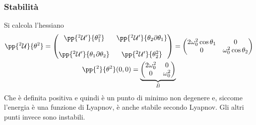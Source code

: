 \documentclass[Main.tex]{subfiles}
\begin{document}
\begin{tema}
\subsubsection*{Stabilità}
Si calcola l'hessiano
\begin{gather}
	\pp{^2 \U}{\theta^2} = \left(\begin{matrix}
		\pp{^2 \U'}{\theta_1^2} & \pp{^2 \U'}{\theta _2 \partial \theta_1} \\  \ \\
		\pp{^2 \U' }{\theta_1 \partial \theta_2} & \pp{^2 \U'}{\theta_2^2}
	\end{matrix}\right) = \left( \begin{matrix}
		2 \omega_0^2 \cos \theta_1 & 0 \\ 0 & \omega_0 ^2 \cos \theta_2
	\end{matrix} \right)\\
	\pp{^2}{\theta^2} (0,0) =  \underbrace{ \left(\begin{matrix}
		2 \omega_0^2 & 0 \\ 0 & \omega_0^2
	\end{matrix} \right)}_{\bar B}
\end{gather}
Che è definita positiva e quindi è un punto di minimo non degenere e, siccome l'energia è una funzione di Lyapnov, è anche stabile secondo Lyapnov. Gli altri punti invece sono instabili.



\end{tema}
\end{document}
